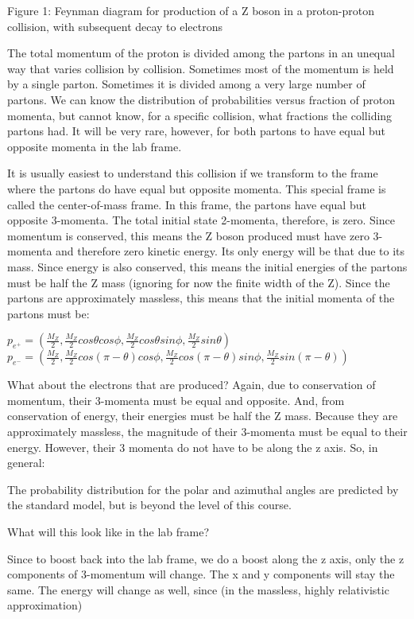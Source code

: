 Figure 1: Feynman diagram for production of a Z boson in a proton-proton collision, with subsequent decay to electrons


The total momentum of the proton is divided among the partons in an unequal way that varies collision by collision.  Sometimes most of the momentum is held by a single parton.  Sometimes it is divided among a very large number of partons.  We can know the distribution of probabilities versus fraction of proton momenta, but cannot know, for a specific collision, what fractions the colliding partons had.  It will be very rare, however, for both partons to have equal but opposite momenta in the lab frame.

It is usually easiest to understand this collision if we transform to the frame where the partons do have equal but opposite momenta.  This special frame is called the center-of-mass frame.  In this frame, the partons have equal but opposite 3-momenta.  The total initial state 2-momenta, therefore, is zero.  Since momentum is conserved, this means the Z boson produced must have zero 3-momenta and therefore zero kinetic energy.  Its only energy will be that due to its mass.  Since energy is also conserved, this means the initial energies of the partons must be half the Z mass (ignoring for now the finite width of the Z).  Since the partons are approximately massless, this means that the initial momenta of the partons must be:

$ p_{e^+} = (\frac{M_Z}{2}, \frac{M_Z}{2} cos \theta cos \phi ,  \frac{M_Z}{2} cos \theta sin \phi , \frac{M_Z}{2} sin \theta)$ 
$ p_{e^-} = (\frac{M_Z}{2}, \frac{M_Z}{2} cos (\pi - \theta) cos \phi ,  \frac{M_Z}{2} cos  (\pi - \theta) sin \phi , \frac{M_Z}{2} sin  (\pi - \theta))$ 

What about the electrons that are produced?  Again, due to conservation of momentum, their 3-momenta must be equal and opposite.  And, from conservation of energy, their energies must be half the Z mass.  Because they are approximately massless, the magnitude of their 3-momenta must be equal to their energy.  However, their 3 momenta do not have to be along the z axis.  So, in general:
	  
The probability distribution for the polar and azimuthal angles are predicted by the standard model, but is beyond the level of this course.

What will this look like in the lab frame?

Since to boost back into the lab frame, we do a boost along the z axis, only the z components of 3-momentum will change.  The x and y components will stay the same.  The energy will change as well, since (in the massless, highly relativistic approximation)

